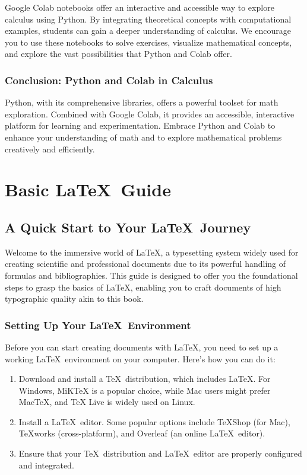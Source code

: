\documentclass[a4paper,12pt]{book}
\newcounter{problem}
\newcounter{example}
\begin{document}
Google Colab notebooks offer an interactive and accessible way to explore calculus using Python. By integrating theoretical concepts with computational examples, students can gain a deeper understanding of calculus. We encourage you to use these notebooks to solve exercises, visualize mathematical concepts, and explore the vast possibilities that Python and Colab offer.


\subsection*{Conclusion: Python and Colab in Calculus}

Python, with its comprehensive libraries, offers a powerful toolset for math exploration. Combined with Google Colab, it provides an accessible, interactive platform for learning and experimentation. Embrace Python and Colab to enhance your understanding of math and to explore mathematical problems creatively and efficiently.


\chapter{Basic \LaTeX\ Guide}
\section*{A Quick Start to Your \LaTeX\ Journey}

Welcome to the immersive world of \LaTeX, a typesetting system widely used for creating scientific and professional documents due to its powerful handling of formulas and bibliographies. This guide is designed to offer you the foundational steps to grasp the basics of \LaTeX, enabling you to craft documents of high typographic quality akin to this book.

\subsection*{Setting Up Your \LaTeX\ Environment}

Before you can start creating documents with \LaTeX, you need to set up a working \LaTeX\ environment on your computer. Here's how you can do it:

\begin{enumerate}
    \item Download and install a \TeX\ distribution, which includes \LaTeX. For Windows, MiKTeX is a popular choice, while Mac users might prefer MacTeX, and TeX Live is widely used on Linux.
    \item Install a \LaTeX\ editor. Some popular options include TeXShop (for Mac), TeXworks (cross-platform), and Overleaf (an online \LaTeX\ editor).
    \item Ensure that your \TeX\ distribution and \LaTeX\ editor are properly configured and integrated.
\end{enumerate}
\end{document}
